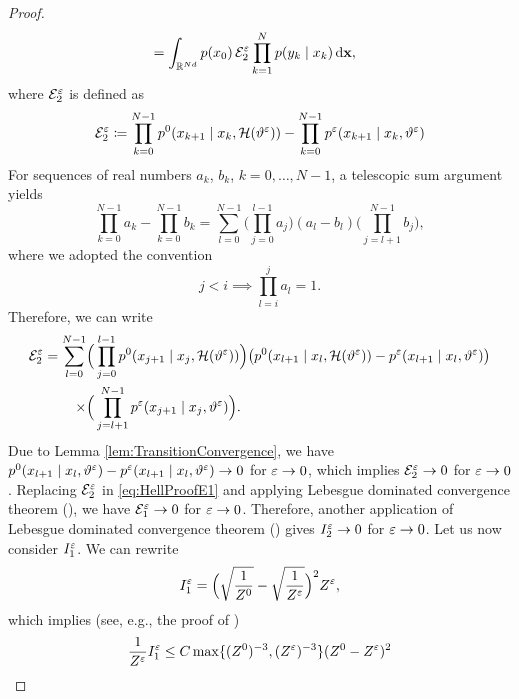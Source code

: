 \documentclass[10pt]{article}
\begin{document}
\begin{proof}
\begin{equation}
\begin{aligned}
		&= \int_{\mathbb{R}^{Nd}} p(x_0) \, \mathcal E_2^\varepsilon \prod_{k=1}^{N} p(y_k \mid x_k) \,\mathrm{d} \mathbf x,
	\end{aligned}
	\end{equation}
	where $\mathcal E_2^\varepsilon$ is defined as
	\begin{equation}
		\mathcal E_2^\varepsilon \coloneqq \prod_{k=0}^{N-1} p^0(x_{k+1}\mid x_k, \mathcal H(\vartheta^\varepsilon)) - \prod_{k=0}^{N-1} p^\varepsilon(x_{k+1}\mid x_k, \vartheta^\varepsilon)
	\end{equation}
	For sequences of real numbers $a_k$, $b_k$, $k = 0, \ldots, N-1$, a telescopic sum argument yields 
	\begin{equation} 
		\prod_{k=0}^{N-1} a_k - \prod_{k=0}^{N-1} b_k = \sum_{l=0}^{N-1} \Big(\prod_{j=0}^{l-1} a_j\Big)(a_l - b_l) \Big(\prod_{j=l+1}^{N-1} b_j\Big),
	\end{equation}
	where we adopted the convention
	\begin{equation}
		j < i \implies \prod_{l=i}^j a_l = 1.
	\end{equation}
	Therefore, we can write
	\begin{equation}
	\begin{aligned}
		\mathcal E_2^\varepsilon = \sum_{l=0}^{N-1} &\Big(\prod_{j=0}^{l-1} p^0(x_{j+1}\mid x_j, \mathcal H(\vartheta^\varepsilon)) \Big) \big(p^0(x_{l+1}\mid x_l, \mathcal H(\vartheta^\varepsilon)) - p^\varepsilon(x_{l+1}\mid x_l, \vartheta^\varepsilon)\big)\\
		\times &\Big(\prod_{j=l+1}^{N-1} p^\varepsilon(x_{j+1}\mid x_j, \vartheta^\varepsilon)\Big).
	\end{aligned}
	\end{equation}
	Due to Lemma \ref{lem:TransitionConvergence}, we have $p^0(x_{l+1}\mid x_l, \vartheta^\varepsilon) - p^\varepsilon(x_{l+1}\mid x_l, \vartheta^\varepsilon) \to 0$ for $ \varepsilon \to 0$, which implies $\mathcal E_2^\varepsilon \to 0$ for $\varepsilon \to 0$. Replacing $\mathcal E^\varepsilon_2$ in \eqref{eq:HellProofE1} and applying Lebesgue dominated convergence theorem (), we have $\mathcal E^\varepsilon_1 \to 0$ for $\varepsilon \to 0$. Therefore, another application of Lebesgue dominated convergence theorem () gives $I_2^\varepsilon \to 0$ for $\varepsilon \to 0$. Let us now consider $I_1^\varepsilon$. We can rewrite 
	\begin{equation}
		I_1^\varepsilon = \Big(\sqrt{\frac{1}{Z^0}} - \sqrt{\frac{1}{Z^\varepsilon}}\Big)^2 Z^\varepsilon,
	\end{equation}
	which implies (see, e.g., the proof of \cite[Theorem 4.6]{Stu10})
	\begin{equation}
	\begin{aligned}
		\frac{1}{Z^\epl}I_1^\epl &\leq C \max\{(Z^0)^{-3}, (Z^\epl)^{-3}\}(Z^0 - Z^\epl)^2\\

\end{aligned}
\end{equation}
\end{proof}
\end{document}
